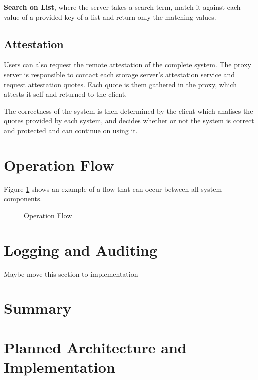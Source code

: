 \textbf{Search on List}, where the server takes a search term, match it against each value of a provided key of a list and return only the matching values.

\subsection{Attestation}
\label{ssec:proxy_attestation}

Users can also request the remote attestation of the complete system. The proxy server is responsible to contact each storage server's attestation service and request attestation quotes. Each quote is them gathered in the proxy, which attests it self and returned to the client. 

The correctness of the system is then determined by the client which analises the quotes provided by each system, and decides whether  or not the system is correct and protected and can continue on using it.

\section{Operation Flow}
\label{sec:operation_flow}

Figure \ref{fig:operation_flow} shows an example of a flow that can occur between all system components.

\begin{figure}[htbp]
  \caption{Operation Flow}
  \label{fig:operation_flow}
\end{figure}

\section{Logging and Auditing} %
\label{sec:logging_and_auditing}

Maybe move this section to implementation

\section{Summary} %
\label{sec:chapter3_summary}


\section{Planned Architecture and Implementation} %
\label{sec:planned_architecture_and_implementation}

